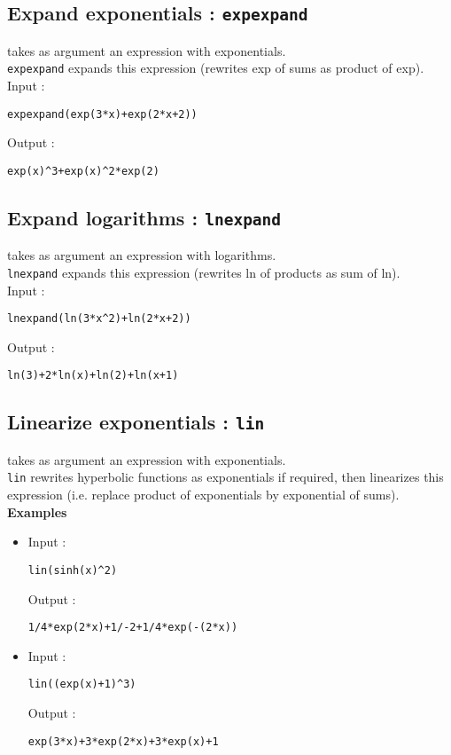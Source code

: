 \documentclass[a4paper,11pt]{book}
\begin{document}
\subsection{Expand exponentials : {\tt expexpand}}
 takes as argument an expression with exponentials.\\
{\tt expexpand} expands this expression (rewrites exp of sums as
product of exp).\\
Input :
\begin{center}{\tt expexpand(exp(3*x)+exp(2*x+2))}\end{center}
Output :
\begin{center}{\tt exp(x)\verb|^|3+exp(x)\verb|^|2*exp(2)}\end{center}

\subsection{Expand logarithms : {\tt lnexpand}}
 takes as argument an expression with logarithms.\\
{\tt lnexpand} expands this expression (rewrites ln of products
as sum of ln).\\
Input :
\begin{center}{\tt lnexpand(ln(3*x\verb|^|2)+ln(2*x+2))}\end{center}
Output :
\begin{center}{\tt  ln(3)+2*ln(x)+ln(2)+ln(x+1)}\end{center}

\subsection{Linearize exponentials : {\tt lin}}
 takes as argument an expression with
exponentials.\\
{\tt lin} rewrites hyperbolic functions as exponentials if required,
then linearizes this expression (i.e. replace product of
exponentials by exponential of sums).\\
{\bf Examples}
\begin{itemize}
\item Input :
\begin{center}{\tt lin(sinh(x)\verb|^|2)}\end{center}
Output :
\begin{center}{\tt 1/4*exp(2*x)+1/-2+1/4*exp(-(2*x))}\end{center}

\item Input :
\begin{center}{\tt lin((exp(x)+1)\verb|^|3)}\end{center}
Output :
\begin{center}{\tt exp(3*x)+3*exp(2*x)+3*exp(x)+1}\end{center}
\end{itemize}
\end{document}
